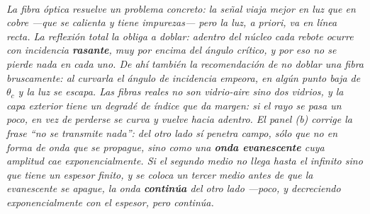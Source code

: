 \begin{center}
\\[0.5em]
{\small\itshape La fibra óptica resuelve un problema concreto: la señal viaja
mejor en luz que en cobre ---que se calienta y tiene impurezas--- pero la luz, a
priori, va en línea recta. La reflexión total la obliga a doblar: adentro del
núcleo cada rebote ocurre con incidencia \textbf{rasante}, muy por encima del
ángulo crítico, y por eso no se pierde nada en cada uno. De ahí también la
recomendación de no doblar una fibra bruscamente: al curvarla el ángulo de
incidencia empeora, en algún punto baja de $\theta_c$ y la luz se escapa. Las
fibras reales no son vidrio-aire sino dos vidrios, y la capa exterior tiene un
degradé de índice que da margen: si el rayo se pasa un poco, en vez de perderse
se curva y vuelve hacia adentro. El panel (b) corrige la frase
\enquote{no se transmite nada}: del otro lado sí penetra campo, sólo que no en
forma de onda que se propague, sino como una \textbf{onda evanescente} cuya
amplitud cae exponencialmente. Si el segundo medio no llega hasta el infinito
sino que tiene un espesor finito, y se coloca un tercer medio antes de que la
evanescente se apague, la onda \textbf{continúa} del otro lado ---poco, y
decreciendo exponencialmente con el espesor, pero continúa.}
\end{center}
